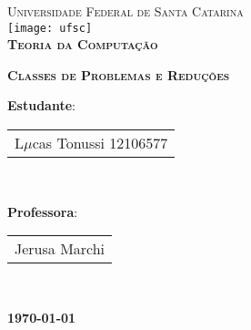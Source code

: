 \begin{titlepage}
\begin{center}

\textsc{\large Universidade Federal de Santa Catarina}\\[1cm]

\texttt{[image: ufsc]}\\[1.5cm]

\textsc{\LARGE \bfseries Teoria da Computação \\ [0.8cm]}

\textsc{\LARGE \bfseries Classes de Problemas e Reduções \\ [3cm]}


\begin{Large}
\textbf{Estudante}:
\begin{tabular}{|l}
L$\mu$cas Tonussi 12106577\\
\end{tabular} \\[0.5cm]
\end{Large}

\vfill

\begin{Large}
\textbf{Professora}:
\begin{tabular}{|l}
Jerusa Marchi  \\
\end{tabular} \\[0.5cm]
\end{Large}

\vfill


\textbf{\today}

\end{center}
\end{titlepage}